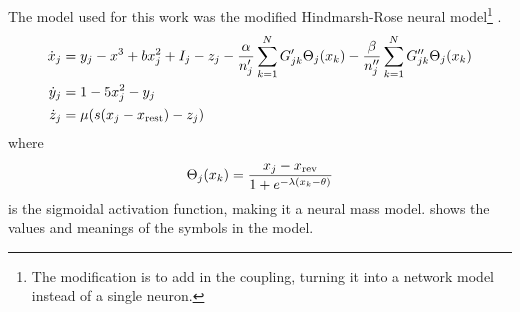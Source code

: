 The model used for this work was the modified Hindmarsh-Rose neural model\footnote{The modification is to add in the coupling, turning it into a network model instead of a single neuron.} \cite{Santos2017}.
\begin{align}
  \label{eq:hr_x}
  \dot{\hrx}_{j}
  &=
    \hry_{j}
    -
    \hrx^{3}
    +
    b \hrx_{j}^{2}
    +
    I_{j}
    -
    \hrz_{j}
    -
    \frac{\hra}{n'_{j}} \sum_{k = 1}^{N} G'_{j k} \Theta_{j}(\hrx_{k})
    -
    \frac{\hrb}{n''_{j}} \sum_{k = 1}^{N} G''_{j k} \Theta_{j}(\hrx_{k}) \\
  \label{eq:hr_y}
  \dot{\hry}_{j}
  &=
    1
    -
    5 \hrx_{j}^{2}
    -
    \hry_{j} \\
  \label{eq:hr_z}
  \dot{\hrz}_{j}
  &=
    \mu \pqty{s \pqty{\hrx_{j} - \hrx_{\text{rest}}} - \hrz_{j}}
\end{align}
where
\begin{equation}
  \label{eq:hr_sigmoid}
  \Theta_{j}(\hrx_{k})
  =
  \frac{\hrx_{j} - \hrx_{\text{rev}}}{1 + e^{-\lambda \pqty{\hrx_{k} - \theta}}}
\end{equation}
is the sigmoidal activation function, making it a neural mass model.
 shows the values and meanings of the symbols in the model.

